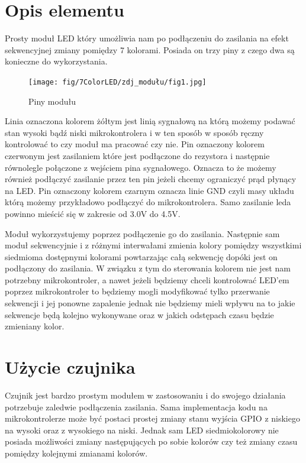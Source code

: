 \documentclass[11pt, a4paper]{article}
\institute{Instytut Robotyki i Inteligencji Maszynowej}
\begin{document}
\newpage

\section*{Opis elementu} 
Prosty moduł LED który umożliwia nam po podłączeniu do zasilania na efekt sekwencyjnej zmiany pomiędzy 7 kolorami. Posiada on trzy piny z czego dwa są konieczne do wykorzystania.

\begin{figure}[H]
    \centering
    \texttt{[image: fig/7ColorLED/zdj\_modułu/fig1.jpg]}
    \caption{Piny modułu}
    \label{fig:fig1}
\end{figure}

Linia oznaczona kolorem żółtym jest linią sygnałową na którą możemy podawać stan wysoki bądź niski mikrokontrolera i w ten sposób w sposób ręczny kontrolować to czy moduł ma pracować czy nie. Pin oznaczony kolorem czerwonym jest zasilaniem które jest podłączone do rezystora i następnie równolegle połączone z wejściem pina sygnałowego. Oznacza to że możemy również podłączyć zasilanie przez ten pin jeżeli chcemy ograniczyć prąd płynący na LED. Pin oznaczony kolorem czarnym oznacza linie GND czyli masy układu którą możemy przykładowo podłączyć do mikrokontrolera. Samo zasilanie leda powinno mieścić się w zakresie od 3.0V do 4.5V. 


Moduł wykorzystujemy poprzez podłączenie go do zasilania. Następnie sam moduł sekwencyjnie i z różnymi interwałami zmienia kolory pomiędzy wszystkimi siedmioma dostępnymi kolorami powtarzając całą sekwencję dopóki jest on podłączony do zasilania. W związku z tym do sterowania kolorem nie jest nam potrzebny mikrokontroler, a nawet jeżeli będziemy chceli kontrolować LED'em poprzez mikrokontroler to będziemy mogli modyfikować tylko przerwanie sekwencji i jej ponowne zapalenie jednak nie będziemy mieli wpływu na to jakie sekwencje będą kolejno wykonywane oraz w jakich odstępach czasu będzie zmieniany kolor.


\newpage

\section{Użycie czujnika}
Czujnik jest bardzo prostym modułem w zastosowaniu i do swojego działania potrzebuje zaledwie podłączenia zasilania. Sama implementacja kodu na mikrokontrolerze może być postaci prostej zmiany stanu wyjścia GPIO z niskiego na wysoki oraz z wysokiego na niski. Jednak sam LED siedmiokolorowy nie posiada możliwości zmiany następujących po sobie kolorów czy też zmiany czasu pomiędzy kolejnymi zmianami kolorów.
\end{document}
